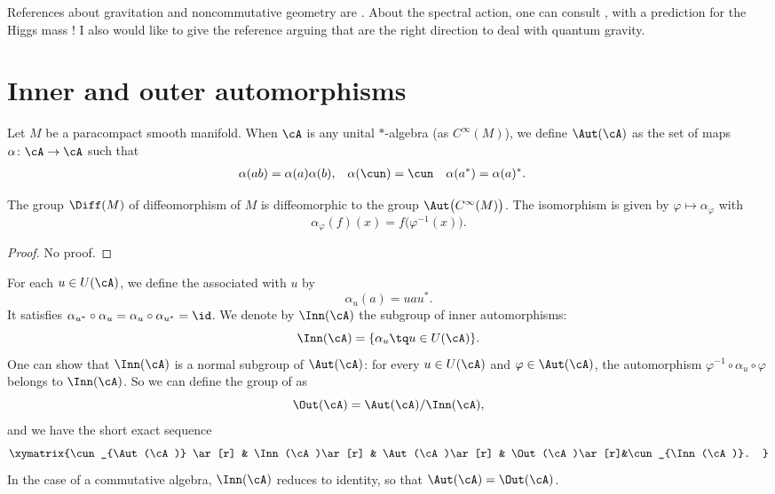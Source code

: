 References about gravitation and noncommutative geometry are \cite{ConnesMotives,Landi,ConnesNCG,itoNCG_Varilly}. About the spectral action, one can consult \cite{SpectralActPrinciple}, with a prediction for the Higgs mass ! I also would like to give the reference \cite{MrTopos} arguing that  are the right direction to deal with quantum gravity.

\section{Inner and outer automorphisms}

Let $M$ be a paracompact smooth manifold. When $\cA$ is any unital $*$-algebra (as $ C^{\infty}(M)$), we define $\Aut(\cA)$ as the set of maps $\alpha\colon \cA\to \cA$ such that
\begin{align}
\alpha(ab)&=\alpha(a)\alpha(b),  
&\alpha(\cun)&=\cun
 & \alpha(a^*)&=\alpha(a)^*.
\end{align}

\begin{proposition}
The group $\Diff(M)$ of diffeomorphism of $M$ is diffeomorphic to the group $\Aut\big(  C^{\infty}(M) \big)$. The isomorphism is given by $\varphi\mapsto\alpha_{\varphi}$ with
\[ 
  \alpha_{\varphi}(f)(x)=f\big( \varphi^{-1}(x) \big).
\]
\end{proposition}
\begin{proof}
No proof.
\end{proof}

For each $u\in U(\cA)$, we define the  associated with $u$ by
\begin{equation}
\alpha_u(a)=uau^*.
\end{equation}
It satisfies $\alpha_{u^*}\circ\alpha_{u}=\alpha_u\circ\alpha_{u^*}=\id$. We denote by $\Inn(\cA)$ the subgroup of inner automorphisms:
\[ 
  \Inn(\cA)=\{ \alpha_u\tq u\in U(\cA) \}.
\]
One can show that $\Inn(\cA)$ is a normal subgroup of $\Aut(\cA)$: for every $u\in U(\cA)$ and $\varphi\in\Aut(\cA)$, the automorphism $\varphi^{-1}\circ\alpha_u\circ\varphi$ belongs to $\Inn(\cA)$. So we can define the group of  as
\[ 
  \Out(\cA)=\Aut(\cA)/\Inn(\cA),
\]
and we have the short exact sequence
\begin{equation}
\xymatrix{%
   \cun_{\Aut(\cA)} \ar[r]	&	\Inn(\cA)\ar[r]	&	\Aut(\cA)\ar[r]	&	\Out(\cA)\ar[r]&\cun_{\Inn(\cA)}.
}
\end{equation}
In the case of a commutative algebra, $\Inn(\cA)$ reduces to identity, so that $\Aut(\cA)=\Out(\cA)$. 


